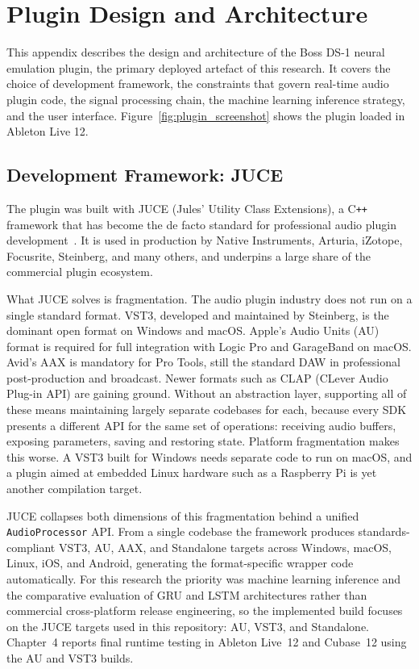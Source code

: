 \chapter{Plugin Design and Architecture}

This appendix describes the design and architecture of the Boss DS-1 neural emulation plugin, the primary deployed artefact of this research. It covers the choice of development framework, the constraints that govern real-time audio plugin code, the signal processing chain, the machine learning inference strategy, and the user interface. Figure~\ref{fig:plugin_screenshot} shows the plugin loaded in Ableton Live 12.

\section{Development Framework: JUCE}

The plugin was built with JUCE (Jules' Utility Class Extensions), a C\texttt{++} framework that has become the de facto standard for professional audio plugin development~\cite{noauthor_juce-frameworkjuce_2026}. It is used in production by Native Instruments, Arturia, iZotope, Focusrite, Steinberg, and many others, and underpins a large share of the commercial plugin ecosystem.

What JUCE solves is fragmentation. The audio plugin industry does not run on a single standard format. VST3, developed and maintained by Steinberg, is the dominant open format on Windows and macOS. Apple's Audio Units (AU) format is required for full integration with Logic Pro and GarageBand on macOS. Avid's AAX is mandatory for Pro Tools, still the standard DAW in professional post-production and broadcast. Newer formats such as CLAP (CLever Audio Plug-in API) are gaining ground. Without an abstraction layer, supporting all of these means maintaining largely separate codebases for each, because every SDK presents a different API for the same set of operations: receiving audio buffers, exposing parameters, saving and restoring state. Platform fragmentation makes this worse. A VST3 built for Windows needs separate code to run on macOS, and a plugin aimed at embedded Linux hardware such as a Raspberry Pi is yet another compilation target.

JUCE collapses both dimensions of this fragmentation behind a unified \texttt{AudioProcessor} API. From a single codebase the framework produces standards-compliant VST3, AU, AAX, and Standalone targets across Windows, macOS, Linux, iOS, and Android, generating the format-specific wrapper code automatically. For this research the priority was machine learning inference and the comparative evaluation of GRU and LSTM architectures rather than commercial cross-platform release engineering, so the implemented build focuses on the JUCE targets used in this repository: AU, VST3, and Standalone. Chapter~4 reports final runtime testing in Ableton Live~12 and Cubase~12 using the AU and VST3 builds.


